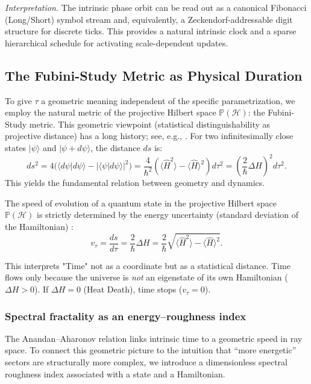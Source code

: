 \noindent\textit{Interpretation.} The intrinsic phase orbit can be read out as a canonical Fibonacci (Long/Short) symbol stream and, equivalently, a Zeckendorf-addressable digit structure for discrete ticks. This provides a natural intrinsic clock and a sparse hierarchical schedule for activating scale-dependent updates.

\subsection{The Fubini-Study Metric as Physical Duration}
To give $\tau$ a geometric meaning independent of the specific parametrization, we employ the natural metric of the projective Hilbert space $\mathbb{P}(\mathcal{H})$: the Fubini-Study metric.
This geometric viewpoint (statistical distinguishability as projective distance) has a long history; see, e.g., \cite{ProvostVallee1980,Wootters1981}.
For two infinitesimally close states $|\psi\rangle$ and $|\psi + d\psi\rangle$, the distance $ds$ is:
\begin{equation}
    ds^2 = 4\Big(\langle d\psi | d\psi \rangle - |\langle \psi | d\psi \rangle|^2\Big)
    = \frac{4}{\hbar^2}\left( \langle \hat{H}^2 \rangle - \langle \hat{H} \rangle^2 \right) d\tau^2
    = \left(\frac{2}{\hbar}\Delta H\right)^2 d\tau^2.
\end{equation}
This yields the fundamental relation between geometry and dynamics.
\begin{theorem}
The speed of evolution of a quantum state in the projective Hilbert space $\mathbb{P}(\mathcal{H})$ is strictly determined by the energy uncertainty (standard deviation of the Hamiltonian) \cite{AharonovAnandan1987,Anandan1990}:
\begin{equation}
    v_{\tau} = \frac{ds}{d\tau} = \frac{2}{\hbar} \Delta H = \frac{2}{\hbar} \sqrt{\langle \hat{H}^2 \rangle - \langle \hat{H} \rangle^2}.
\end{equation}
\end{theorem}
This interprets "Time" not as a coordinate but as a statistical distance. Time flows only because the universe is \textit{not} an eigenstate of its own Hamiltonian ($\Delta H > 0$). If $\Delta H = 0$ (Heat Death), time stops ($v_{\tau} = 0$).

\subsubsection{Spectral fractality as an energy--roughness index}
The Anandan--Aharonov relation links intrinsic time to a geometric speed in ray space. To connect this
geometric picture to the intuition that ``more energetic'' sectors are structurally more complex, we introduce
a dimensionless spectral roughness index associated with a state and a Hamiltonian.\par

